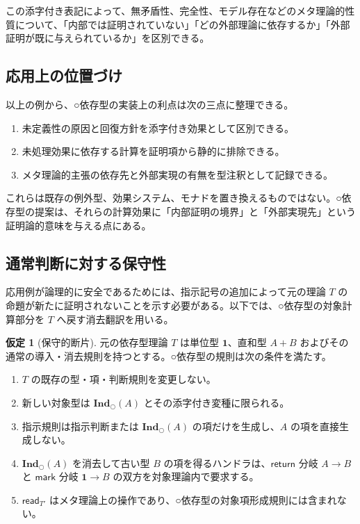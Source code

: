 \documentclass[a4paper,11pt]{ltjsarticle}
\theoremstyle{definition}
\newtheorem{assumption}[definition]{仮定}
\theoremstyle{plain}
\newcommand{\dfix}{\bigcirc}
\newcommand{\Ind}{\mathbf{Ind}_{\dfix}}
\newcommand{\Unit}{\mathbf{1}}
\begin{document}
この添字付き表記によって、無矛盾性、完全性、モデル存在などのメタ理論的性質について、「内部では証明されていない」「どの外部理論に依存するか」「外部証明が既に与えられているか」を区別できる。

\subsection{応用上の位置づけ}

以上の例から、○依存型の実装上の利点は次の三点に整理できる。
\begin{enumerate}
 \item 未定義性の原因と回復方針を添字付き効果として区別できる。
 \item 未処理効果に依存する計算を証明項から静的に排除できる。
 \item メタ理論的主張の依存先と外部実現の有無を型注釈として記録できる。
\end{enumerate}

これらは既存の例外型、効果システム、モナドを置き換えるものではない。○依存型の提案は、それらの計算効果に「内部証明の境界」と「外部実現先」という証明論的意味を与える点にある。

\subsection{通常判断に対する保守性}

応用例が論理的に安全であるためには、指示記号の追加によって元の理論 $T$ の命題が新たに証明されないことを示す必要がある。以下では、○依存型の対象計算部分を $T$ へ戻す消去翻訳を用いる。

\begin{assumption}[保守的断片]
元の依存型理論 $T$ は単位型 $\Unit$、直和型 $A+B$ およびその通常の導入・消去規則を持つとする。○依存型の規則は次の条件を満たす。
\begin{enumerate}
 \item $T$ の既存の型・項・判断規則を変更しない。
 \item 新しい対象型は $\Ind(A)$ とその添字付き変種に限られる。
 \item 指示規則は指示判断または $\Ind(A)$ の項だけを生成し、$A$ の項を直接生成しない。
 \item $\Ind(A)$ を消去して古い型 $B$ の項を得るハンドラは、$\mathsf{return}$ 分岐 $A\to B$ と $\mathsf{mark}$ 分岐 $\Unit\to B$ の双方を対象理論内で要求する。
 \item $\mathsf{read}_{T'}$ はメタ理論上の操作であり、○依存型の対象項形成規則には含まれない。
\end{enumerate}
\end{assumption}
\end{document}
